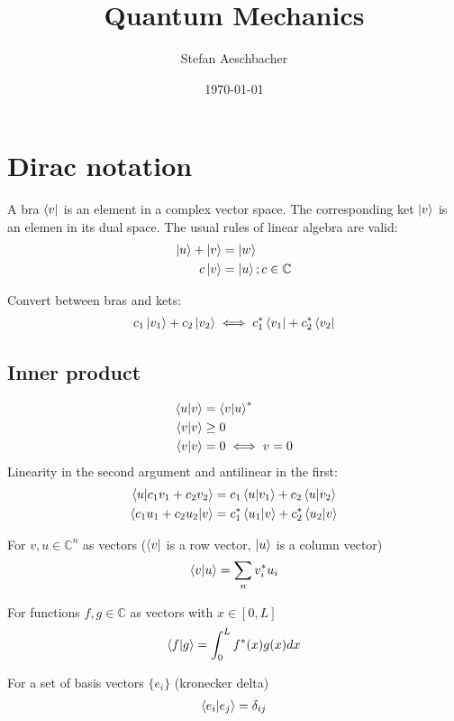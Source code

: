 \documentclass[10pt,a4paper]{book}
\title{Quantum Mechanics}
\author{Stefan Aeschbacher}
\date{\today}
\begin{document}
\maketitle
\tableofcontents

\chapter{Dirac notation}
A bra $\bra{v}$ is an element in a complex vector space. The corresponding ket $\ket{v}$ is an elemen in its dual space.
The usual rules of linear algebra are valid:
\begin{align}
	\ket{u} + \ket{v} & = \ket{w} \\
	c\ket{v} &= \ket{u}; c \in \mathbb{C}
\end{align}

Convert between bras and kets:
\begin{align}
	c_1 \ket{v_1} + c_2 \ket{v_2} \iff c_1^* \bra{v_1} + c_2^* \bra{v_2}
\end{align}

\section{Inner product}
\begin{align}
	\braket{u|v} & = \braket{v|u}^* \\
	\braket{v|v} & \ge 0 \\
	\braket{v|v} &= 0 \iff v = 0
\end{align}
Linearity in the second argument and antilinear in the first:
\begin{align}
	\braket{u|c_1 v_1 + c_2 v_2} & = c_1\braket{u|v_1} + c_2\braket{u|v_2} \\
	\braket{c_1 u_1 + c_2 u_2|v} & = c_1^*\braket{u_1|v} + c_2^*\braket{u_2|v} \\
\end{align}

For $v, u \in \mathbb{C}^n$ as vectors ($\bra{v}$ is a row vector, $\ket{u}$ is a column vector)
\begin{align}
	\braket{v|u} = \sum_{n}v_i^*u_i
\end{align}

For functions $f, g \in \mathbb{C}$ as vectors with $x \in [0,L]$
\begin{align}
	\braket{f|g} = \int_0^Lf^*(x)g(x)dx
\end{align}

For a set of basis vectors $\{e_i\}$ (kronecker delta)
\begin{align}
	\braket{e_i|e_j} = \delta_{ij}
\end{align}
\end{document}
